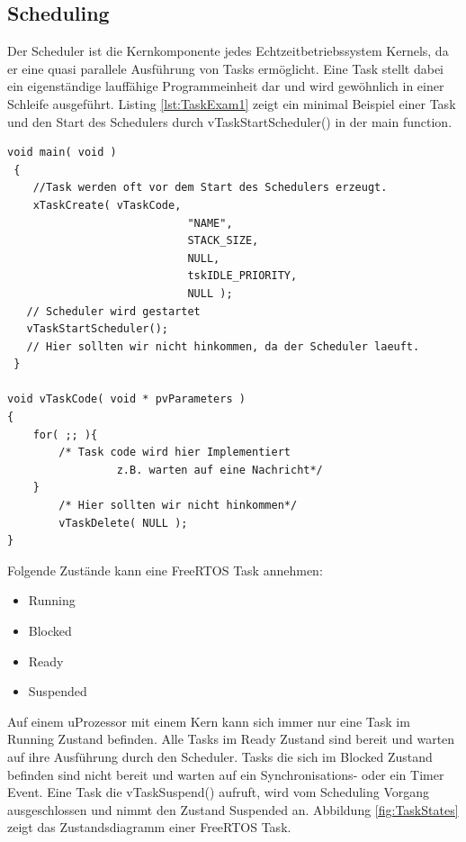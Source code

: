 \subsection{Scheduling}
\label{Scheduling}
Der Scheduler ist die Kernkomponente jedes Echtzeitbetriebssystem Kernels, da er eine quasi parallele Ausführung von Tasks ermöglicht. Eine Task stellt dabei ein ei\-gen\-stän\-di\-ge lauffähige Programmeinheit dar und wird gewöhnlich in einer Schleife ausgeführt. Listing \ref{lst:TaskExam1} zeigt ein minimal Beispiel einer Task und den Start des Schedulers durch vTaskStartScheduler() in der main function. 
\begin{lstlisting}[caption={Minimal Beispiel für die Definition eine Task. }, linewidth=8cm,captionpos=b, label=lst:TaskExam1, float=hbt]
 void main( void )
 {
	//Task werden oft vor dem Start des Schedulers erzeugt.
	xTaskCreate( vTaskCode,
							"NAME",
							STACK_SIZE,
							NULL,
							tskIDLE_PRIORITY,
							NULL );
   // Scheduler wird gestartet
   vTaskStartScheduler();
   // Hier sollten wir nicht hinkommen, da der Scheduler laeuft.
 }

void vTaskCode( void * pvParameters )
{
    for( ;; ){
        /* Task code wird hier Implementiert
				 z.B. warten auf eine Nachricht*/
    }
		/* Hier sollten wir nicht hinkommen*/
		vTaskDelete( NULL );
}
\end{lstlisting}
Folgende Zu\-stän\-de kann eine FreeRTOS Task annehmen: 
\begin{itemize}
	\item Running
	\item Blocked
	\item Ready
	\item Suspended
\end{itemize}
Auf einem uProzessor mit einem Kern kann sich immer nur eine Task im Running Zustand befinden. Alle Tasks im Ready Zustand sind bereit und warten auf ihre Ausführung durch den Scheduler. Tasks die sich im Blocked Zustand befinden sind nicht bereit und warten auf ein Synchronisations- oder ein Timer Event. Eine Task die vTaskSuspend() aufruft, wird vom Scheduling Vorgang ausgeschlossen und nimmt den Zustand Suspended an. Abbildung \ref{fig:TaskStates} zeigt das Zustandsdiagramm einer FreeRTOS Task. 
